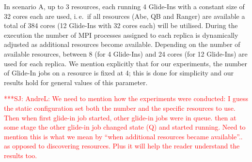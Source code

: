 \documentclass{rspublic}
\newcommand{\alnote}[1]{ {\textcolor{blue} { ***AL: #1 }}}
\newcommand{\jhanote}[1]{ {\textcolor{red} { ***SJ: #1 }}}
\newcommand{\alnote}[1]{}
\newcommand{\jhanote}[1]{}
\begin{document}
                     
In scenario A, up to 3 resources, each running 4 Glide-Ins with a
constant size of 32 cores each are used, i.\,e.\ if all resources
(Abe, QB and Ranger) are available a total of 384 cores (12 Glide-Ins
with 32 cores each) will be utilised.  During the execution the number
of MPI processes assigned to each replica is dynamically adjusted as
additional resources become available. Depending on the number of
available resources, between 8 (for 4 Glide-Ins) and 24 cores (for 12
Glide-Ins) are used for each replica. We mention explicitly that for
our experiments, the number of Glide-In jobs on a resource is fixed at
4; this is done for simplicity and our results hold for general values
of this parameter.

\jhanote{AndreL: We need to mention how the experiments were
  conducted: I guess the static configuration set both the number and
  the specific resources to use. Then when first glide-in job started,
  other glide-in jobs were in queue. then at some stage the other
  glide-in job changed state (Q) and started running. Need to mention
  this is what we mean by ``when additional resources became
  available''.. as opposed to discovering resources. Plus it will help
  the reader understand the results too.}
\end{document}

